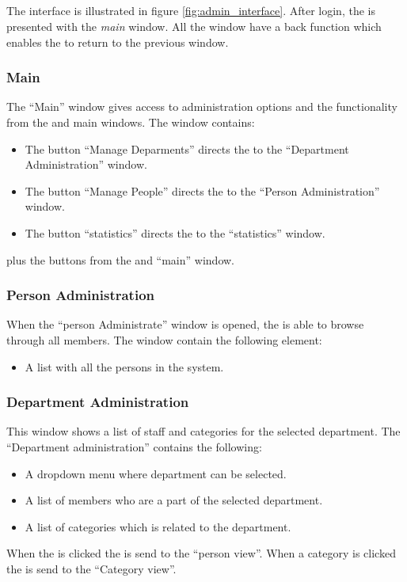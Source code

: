 \subsection{\ainterface}
\label{sec:admininterface}
The \admin[] interface is illustrated in figure \ref{fig:admin_interface}.
After login, the \admin[] is presented with the \textit{main} window. All the window have a back function which enables the \admin[] to return to the previous window.

\subsubsection{Main}
The ``Main'' \admin window gives access to administration options and the functionality from the \astaff and \aclient main windows. The window contains: 
\begin{itemize}
	\item The button ``Manage Deparments'' directs the \admin[] to the ``Department Administration'' window.  
	\item The button ``Manage People'' directs the \admin[] to the ``Person Administration'' window.
	\item The button ``statistics'' directs the \admin[] to the ``statistics'' window.
\end{itemize}
plus the buttons from the \astaff[] and \aclient[] ``main'' window.

\subsubsection{Person Administration}
When the ``person Administrate'' window is opened, the \admin is able to browse through all \astaff members. The window contain the following element:
\begin{itemize}
	\item A list with all the persons in the system.
\end{itemize}

\subsubsection{Department Administration}
This window shows a list of staff and categories for the selected department.
The ``Department administration'' contains the following:
\begin{itemize}
	\item A dropdown menu where department can be selected.
	\item A list of \astaff[] members who are a part of the selected department.
	\item A list of categories which is related to the department.
\end{itemize}
When the \astaff[] is clicked the \admin[] is send to the ``person view''.
When a category is clicked the \admin[] is send to the ``Category view''. 


